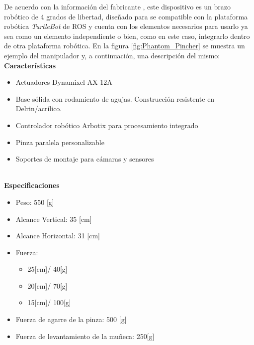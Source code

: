             De acuerdo con la información del fabricante \cite{Interbotix_widowx_PincherArm}, este dispositivo es un brazo robótico de 4 grados de libertad, diseñado para se compatible con la plataforma robótica \textit{TurtleBot} de ROS y cuenta con los elementos necesarios para usarlo ya sea como un elemento independiente o bien, como en este caso, integrarlo dentro de otra plataforma robótica. En la figura \ref{fig:Phantom_Pincher} se muestra un ejemplo del manipulador y, a continuación, una descripción del mismo:
            \phantom{saltodelineaforzado >:D}\\
            
            \textbf{Características}
            \begin{itemize}
                \item Actuadores Dynamixel AX-12A 
                \item Base sólida con rodamiento de agujas. Construcción resistente en Delrin/acrílico.
                \item Controlador robótico Arbotix para procesamiento integrado
                \item Pinza paralela personalizable
                \item Soportes de montaje para cámaras y sensores
            \end{itemize}
            
            \phantom{saltodelineaforzado >:D}\\
            
            \textbf{Especificaciones}
            \begin{itemize}
                \item Peso: 550 [g]
                \item Alcance Vertical: 35 [cm]
                \item Alcance Horizontal: 31 [cm]
                \item Fuerza:
                \begin{itemize}
                    \item 25[cm]/ 40[g]
                    \item 20[cm]/ 70[g]
                    \item 15[cm]/ 100[g]
                \end{itemize}
                \item Fuerza de agarre de la pinza: 500 [g]
                \item Fuerza de levantamiento de la muñeca: 250[g]
            \end{itemize}

